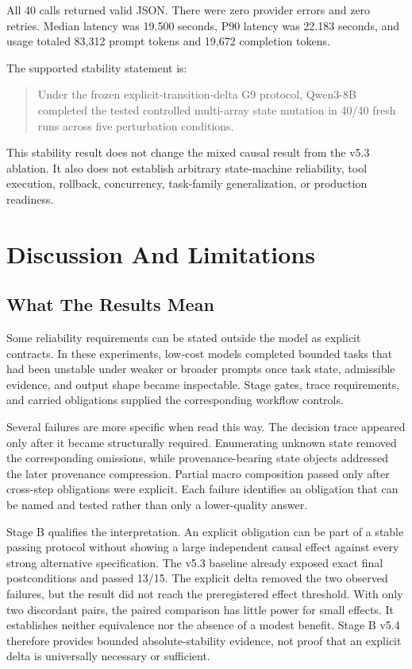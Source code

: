 \documentclass[11pt]{article}
\begin{document}
All 40 calls returned valid JSON. There were zero provider errors and zero retries. Median latency was 19.500 seconds, P90 latency was 22.183 seconds, and usage totaled 83,312 prompt tokens and 19,672 completion tokens.

The supported stability statement is:

\begin{quote}
Under the frozen explicit-transition-delta G9 protocol, Qwen3-8B completed the tested controlled multi-array state mutation in 40/40 fresh runs across five perturbation conditions.
\end{quote}

This stability result does not change the mixed causal result from the v5.3 ablation. It also does not establish arbitrary state-machine reliability, tool execution, rollback, concurrency, task-family generalization, or production readiness.

\section{Discussion And Limitations}

\subsection{What The Results Mean}

Some reliability requirements can be stated outside the model as explicit contracts. In these experiments, low-cost models completed bounded tasks that had been unstable under weaker or broader prompts once task state, admissible evidence, and output shape became inspectable. Stage gates, trace requirements, and carried obligations supplied the corresponding workflow controls.

Several failures are more specific when read this way. The decision trace appeared only after it became structurally required. Enumerating unknown state removed the corresponding omissions, while provenance-bearing state objects addressed the later provenance compression. Partial macro composition passed only after cross-step obligations were explicit. Each failure identifies an obligation that can be named and tested rather than only a lower-quality answer.

Stage B qualifies the interpretation. An explicit obligation can be part of a stable passing protocol without showing a large independent causal effect against every strong alternative specification. The v5.3 baseline already exposed exact final postconditions and passed 13/15. The explicit delta removed the two observed failures, but the result did not reach the preregistered effect threshold. With only two discordant pairs, the paired comparison has little power for small effects. It establishes neither equivalence nor the absence of a modest benefit. Stage B v5.4 therefore provides bounded absolute-stability evidence, not proof that an explicit delta is universally necessary or sufficient.
\end{document}

